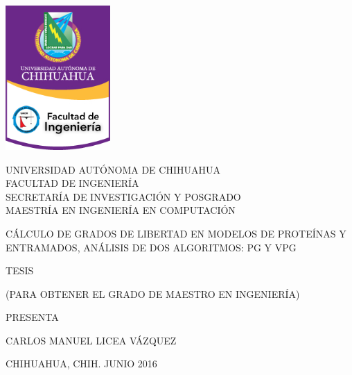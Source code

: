 \begin{titlepage}
	\begin{center}                

		\begin{minipage}{4cm}
  	  \includegraphics[width=4cm]{images/uach}
	  \end{minipage}
  	\hfill
	  \begin{minipage}{10cm}
	  	\centering
      UNIVERSIDAD AUTÓNOMA DE CHIHUAHUA \\[0.3\baselineskip]
  	  FACULTAD DE INGENIERÍA \\[0.3\baselineskip]
	    SECRETARÍA DE INVESTIGACIÓN Y POSGRADO \\[0.3\baselineskip]
    	MAESTRÍA EN INGENIERÍA EN COMPUTACIÓN
		\end{minipage}
			
		\vspace{1.5cm}

		\begin{doublespace}
			CÁLCULO DE GRADOS DE LIBERTAD EN MODELOS DE PROTEÍNAS Y ENTRAMADOS, ANÁLISIS DE DOS ALGORITMOS: PG Y VPG 
		\end{doublespace}

		\vspace{1cm}

    TESIS
        
		\vspace{1cm}

    (PARA OBTENER EL GRADO DE MAESTRO EN INGENIERÍA)
        
		\vspace{1cm}

		PRESENTA

		\vspace{1cm}
				     
		CARLOS MANUEL LICEA VÁZQUEZ
        
    \vfill
                
    CHIHUAHUA, CHIH. \hfill JUNIO 2016      
	\end{center}
\end{titlepage}

